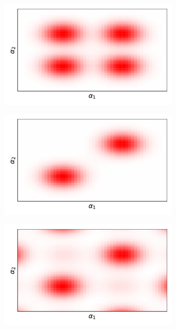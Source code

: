 \begin{figure}[t]
     \centering
     \begin{subfigure}[b]{0.32\textwidth}
         \centering
         \includegraphics[width=\textwidth]{figures/q_mixed.pdf}
         \caption{}
         \label{fig:ground}
     \end{subfigure}
     \hfill
     \begin{subfigure}[b]{0.32\textwidth}
         \centering
         \includegraphics[width=\textwidth]{figures/q_entangled.pdf}
         \caption{}
         \label{fig:initialized_cat}
     \end{subfigure}
     \hfill
     \begin{subfigure}[b]{0.32\textwidth}
         \centering
         \includegraphics[width=\textwidth]{figures/q_actual.pdf}

\end{subfigure}
\end{figure}
